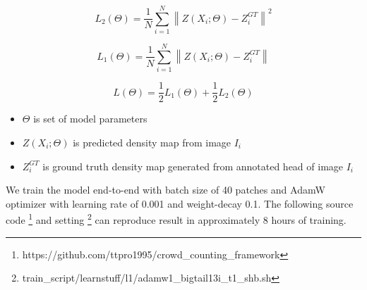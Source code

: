 \begin{equation}L_2(\Theta)=\frac{1}{N} \sum_{i=1}^{N}\left\|Z\left(X_{i} ; \Theta\right)-Z_{i}^{G T}\right\|^{2}\end{equation}

\begin{equation}L_1(\Theta)=\frac{1}{N} \sum_{i=1}^{N}\left\|Z\left(X_{i} ; \Theta\right)-Z_{i}^{G T}\right\|\end{equation}

\begin{equation}
    L(\Theta) = \frac{1}{2}L_1(\Theta) + \frac{1}{2}L_2(\Theta)
\end{equation}

\begin{itemize}
  \item $\Theta$ is set of model parameters
  \item $Z\left(X_{i} ; \Theta\right)$ is predicted density map from image $I_i$
  \item $Z_{i}^{G T}$ is ground truth density map generated from annotated head of image $I_i$
\end{itemize}

 
 We train the model end-to-end with batch size of 40 patches and AdamW optimizer \cite{loshchilov2017decoupled} with learning rate of 0.001 and weight-decay 0.1. The following source code \footnote{https://github.com/ttpro1995/crowd\_counting\_framework} and setting \footnote{train\_script/learnstuff/l1/adamw1\_bigtail13i\_t1\_shb.sh} can reproduce result in approximately 8 hours of training.








